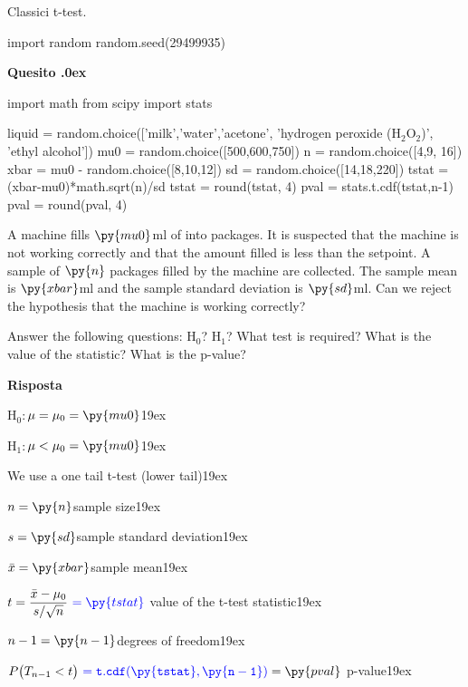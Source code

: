 \documentclass[11pt,twoside,a4paper]{article}
\newcounter{quesito}
\newenvironment{question}{\bigskip\addtocounter{quesito}{1}\bigskip\bigskip\par\textbf{Quesito \thequesito.\kern0ex}}{\par\vspace{\parskip}}
\newenvironment{answer}{\par\textbf{Risposta\quad}}{\par\vspace{\parskip}}
\begin{document}
\colorbox{blue!10}{\begin{minipage}{\textwidth}
Classici t-test.
\end{minipage}}

\bigskip\bigskip


\begin{pycode}
import random
random.seed(29499935)
\end{pycode}

\begin{question}
\begin{pycode}
import math
from scipy import stats

liquid = random.choice(['milk','water','acetone', 'hydrogen peroxide (H$_2$O$_2$)', 'ethyl alcohol'])
mu0 = random.choice([500,600,750])
n = random.choice([4,9, 16])
xbar = mu0 - random.choice([8,10,12])
sd = random.choice([14,18,220])
tstat = (xbar-mu0)*math.sqrt(n)/sd
tstat = round(tstat, 4)
pval = stats.t.cdf(tstat,n-1)
pval = round(pval, 4)
\end{pycode}
A machine fills $\py{mu0}$ml of  into packages. It is suspected that the machine is not working correctly and that the amount filled is less than the setpoint. A sample of $\py{n}$ packages filled by the machine are collected. The sample mean is $\py{xbar}$ml and the sample standard deviation is $\py{sd}$ml. Can we reject the hypothesis that the machine is working correctly?

Answer the following questions: H$_0$? H$_1$? What test is required? What is the value of the statistic? What is the p-value? 


\begin{answer}

  {\color{blue}
  H$_0:$\hfill $\mu = \mu_0 = \py{mu0}$\kern19ex
  
  H$_1:$\hfill $\mu<\mu_0 = \py{mu0}$\kern19ex
  
  We use a one tail t-test (lower tail)\kern19ex}
  
  $n = \py{n}$\hfill sample size\kern19ex
  
  $s = \py{sd}$\hfill sample standard deviation\kern19ex
  
  $\bar{x} = \py{xbar}$\hfill sample mean\kern19ex
  
  $t = \displaystyle\frac{\bar{x}-\mu_0}{s/\sqrt{n}}\ {\color{blue} = \py{tstat}}$\hfill{\color{blue} value of the t-test statistic}\kern19ex
  
  $n-1 = \py{n-1}$\hfill degrees of freedom\kern19ex
  
  $P\big(T_{n-1}<t\big)\ {\color{blue} = {\tt t.cdf(\py{tstat},\py{n-1} ) }} = \py{pval}$\hfill{\color{blue} p-value}\kern19ex

\end{answer}
\end{question}
\end{document}
